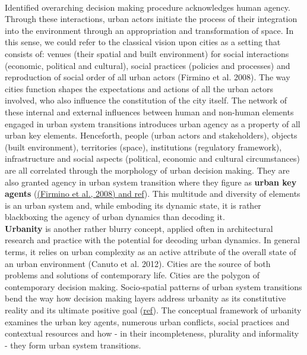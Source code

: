 \documentclass[11pt]{report}
\begin{document}
\\
Identified overarching decision making procedure acknowledges human agency. Through these interactions, urban actors initiate the process of their integration into the environment through an appropriation and transformation of space. In this sense, we could refer to the classical vision upon cities as a setting that consists of: venues (their spatial and built environment) for social interactions (economic, political and cultural), social practices (policies and processes) and reproduction of social order of all urban actors (Firmino et al. 2008). The way cities function shapes the expectations and actions of all the urban actors involved, who also influence the constitution of the city itself. The network of these internal and external influences between human and non-human elements engaged in urban system transitions introduces urban agency as a property of all urban key elements. Henceforth, people (urban actors and stakeholders), objects (built environment), territories (space), institutions (regulatory framework), infrastructure and social  aspects (political, economic and cultural circumstances) are all correlated through the morphology of urban decision making. They are also granted agency in urban system transition where they figure as \textbf{urban key agents} (\href{ref}{(Firmino et al., 2008) and ref}). This multitude and diversity of elements is an urban system and, while emboding its dynamic state, it is rather blackboxing the agency of urban dynamics than decoding it.
\\
\textbf{Urbanity} is another rather blurry concept, applied often in architectural research and practice with the potential for decoding urban dynamics. In general terms, it relies on urban complexity as an active attribute of the overall state of an urban environment (Canuto et al. 2012). Cities are the source of both problems and solutions of contemporary life. Cities are the polygon of contemporary decision making. Socio-spatial patterns of urban system transitions bend the way how decision making layers address urbanity as its constitutive reality and its ultimate positive goal (\href{ref}{ref}). The conceptual framework of urbanity examines the urban key agents, numerous urban conflicts, social practices and contextual resources and how - in their incompleteness, plurality and informality - they form urban system transitions.
\\
\end{document}
